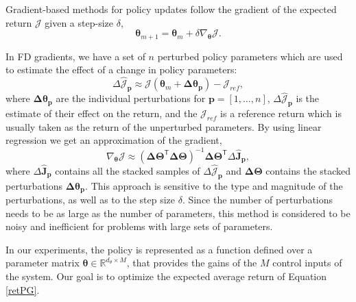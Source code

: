 \documentclass{aamas2016}
\renewcommand{\Re}{\mathbb{R}}
\newcommand{\transpose}{\text{$\mathsf{T}$}}
\begin{document}

Gradient-based methods for policy updates follow the gradient of the expected return $\mathcal{J}$ %
given a step-size $\delta$,
\begin{displaymath}
 \boldsymbol{\theta}_{m+1} = \boldsymbol{\theta}_{m}+\delta\nabla_{\boldsymbol{\theta}}\mathcal{J}.
\end{displaymath}

In FD gradients, we have a set of $n$ perturbed policy parameters which are used to estimate the effect of a change in policy parameters:
\begin{displaymath}
 \Delta\hat{\mathcal{J}}_{\mathbf{p}} \approx \mathcal{J}(\boldsymbol{\theta}_{m}+\boldsymbol{\Delta\theta_{p}}) - \mathcal{J}_{ref},
\end{displaymath}
where $\boldsymbol{\Delta\theta_{p}}$ are the individual perturbations for $\mathbf{p}=[1,\ldots,n]$, $\Delta\hat{\mathcal{J}}_{\mathbf{p}}$ is the estimate of their 
effect on the return, and the $\mathcal{J}_{ref}$ is a reference return which is usually taken as the return of the unperturbed
parameters. By using linear regression we get an approximation of the gradient,
\begin{displaymath}
 \nabla_{\boldsymbol{\theta}}\mathcal{J} \approx \left(\boldsymbol{\Delta\Theta^{\transpose}\Delta\Theta}\right)^{-1}\boldsymbol{\Delta\Theta}^{\transpose}\Delta\boldsymbol{\hat{J}_{p}},
\end{displaymath}
where $\Delta\boldsymbol{\hat{J}_{p}}$ contains all the stacked samples of $\Delta\hat{\mathcal{J}}_{\mathbf{p}}$ and  $\boldsymbol{\Delta\Theta}$
contains the stacked perturbations $\boldsymbol{\Delta\theta_{p}}$. This approach is sensitive to the type and magnitude of the perturbations, as well as
to the step size $\delta$. Since the number of perturbations needs to be as large as the number of parameters, this method is
considered to be noisy and inefficient for problems with large sets of parameters.%

In our experiments, the policy is represented as a function defined over a parameter matrix 
$\boldsymbol{\theta} \in \Re^{d_{\theta}\times M}$, that provides the gains of the $M$ control inputs of the system. 
Our goal is to optimize the expected average return of Equation \ref{retPG}.
\end{document}
